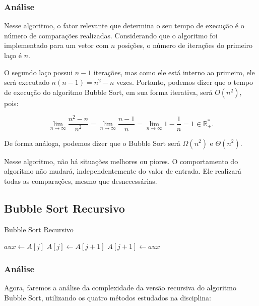 \subsubsection{Análise}
Nesse algoritmo, o fator relevante que determina o seu tempo de execução é o número de comparações realizadas. Considerando que o algoritmo foi implementado para um vetor com \( n \) posições, o número de iterações do primeiro laço é \( n \).

O segundo laço possui \( n-1 \) iterações, mas como ele está interno ao primeiro, ele será executado \( n(n-1) = n^2 - n \) vezes. Portanto, podemos dizer que o tempo de execução do algoritmo Bubble Sort, em sua forma iterativa, será \( O(n^2) \), pois:

\[
\lim_{n \rightarrow \infty} \frac{n^2 - n}{n^2} =
\lim_{n \rightarrow \infty} \frac{n - 1}{n} =
\lim_{n \rightarrow \infty} 1-\frac{1}{n} =
1 \in \mathbb{R}^*_+.
\]

De forma análoga, podemos dizer que o Bubble Sort será \( \Omega(n^2) \) e \( \Theta(n^2) \).

Nesse algoritmo, não há situações melhores ou piores. O comportamento do algoritmo não mudará, independentemente do valor de entrada. Ele realizará todas as comparações, mesmo que desnecessárias.

\newpage

\subsection{Bubble Sort Recursivo}

\begin{algorithm}
    \caption{Bubble Sort Recursivo}
    \label{algo:bubble_sort_recursivo}
    \begin{algorithmic}[1]
        \Statex
                \Return{}
            \EndIf
                    \State $aux \gets A[j]$
                    \State $A[j] \gets A[j + 1]$
                    \State $A[j + 1] \gets aux$
                \EndIf
            \EndFor
            \State {}
        \EndFunction
    \end{algorithmic}
\end{algorithm}

\subsubsection{Análise}
Agora, faremos a análise da complexidade da versão recursiva do algoritmo Bubble Sort, utilizando os quatro métodos estudados na disciplina:


